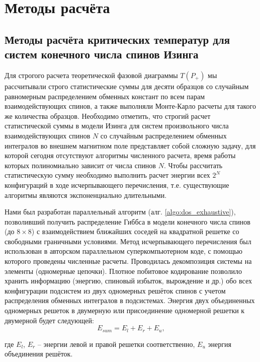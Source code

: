 \chapter{Методы расчёта}\label{ch:ch2}

\section{Методы расчёта критических температур для систем конечного числа спинов Изинга} Для строгого расчета теоретической фазовой диаграммы $T(P_+)$ мы рассчитывали строго статистические суммы для десяти образцов со случайным равномерным распределением обменных констант по всем парам взаимодействующих спинов, а также выполняли Монте-Карло расчеты для такого же количества образцов. Необходимо отметить, что строгий расчет статистической суммы в модели Изинга для систем произвольного числа взаимодействующих спинов $N$ со случайным распределением обменных интегралов во внешнем магнитном поле представляет собой сложную задачу, для которой сегодня отсутствуют алгоритмы численного расчета, время работы которых полиномиально зависит от числа спинов $N$. Чтобы рассчитать статистическую сумму необходимо выполнить расчет энергии всех $2^N$ конфигураций в ходе исчерпывающего перечисления, т.е. существующие алгоритмы являются экспоненциально длительными.

Нами был разработан параллельный алгоритм (алг. \ref{algo:dos_exhaustive}), позволивший получить распределение Гиббса в модели конечного числа спинов (до $8\times8$)  с взаимодействием ближайших соседей на квадратной решетке со свободными граничными условиями. Метод исчерпывающего перечисления был использован в авторском параллельном суперкомпьютерном коде, с помощью которого проведены численные расчеты. Проводилась декомпозиция системы на элементы (одномерные цепочки). Плотное побитовое кодирование позволило хранить информацию (энергию, спиновый избыток, вырождение и др.) обо всех конфигурации подсистем из двух одномерных решёток спинов с учетом распределения обменных интегралов в подсистемах.  Энергия двух объединенных одномерных решеток в двумерную или присоединение одномерной решетки к двумерной будет следующей:
\begin{equation}
	E_{sum}  = E_{l}  + E_{r}  + E_{u},
	\label{eq:unification_energy}
\end{equation}

\noindent где $E_{l}$, $E_{r}$ -- энергии левой и правой решетки соответственно, $E_{u}$ энергия объединения решёток. 

